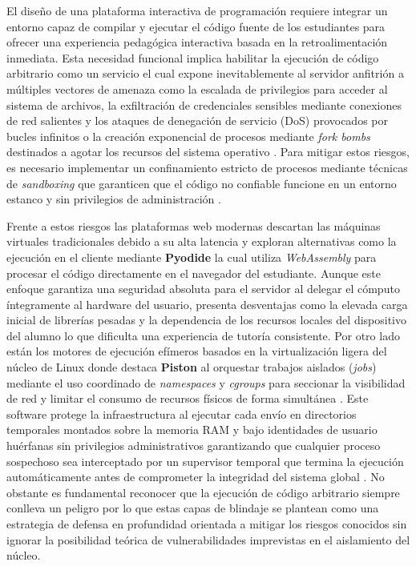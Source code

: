 El diseño de una plataforma interactiva de programación requiere integrar un entorno capaz de compilar y ejecutar el código fuente de los estudiantes para ofrecer una experiencia pedagógica interactiva basada en la retroalimentación inmediata. Esta necesidad funcional implica habilitar la ejecución de código arbitrario como un servicio el cual expone inevitablemente al servidor anfitrión a múltiples vectores de amenaza como la escalada de privilegios para acceder al sistema de archivos, la exfiltración de credenciales sensibles mediante conexiones de red salientes y los ataques de denegación de servicio (DoS) provocados por bucles infinitos o la creación exponencial de procesos mediante \textit{fork bombs} destinados a agotar los recursos del sistema operativo \cite{sun2018security}. Para mitigar estos riesgos, es necesario implementar un confinamiento estricto de procesos mediante técnicas de \textit{sandboxing} que garanticen que el código no confiable funcione en un entorno estanco y sin privilegios de administración \cite{wan2019practical}.

Frente a estos riesgos las plataformas web modernas descartan las máquinas virtuales tradicionales debido a su alta latencia y exploran alternativas como la ejecución en el cliente mediante \textbf{Pyodide} la cual utiliza \textit{WebAssembly} para procesar el código directamente en el navegador del estudiante. Aunque este enfoque garantiza una seguridad absoluta para el servidor al delegar el cómputo íntegramente al hardware del usuario, presenta desventajas como la elevada carga inicial de librerías pesadas y la dependencia de los recursos locales del dispositivo del alumno lo que dificulta una experiencia de tutoría consistente. Por otro lado están los motores de ejecución efímeros basados en la virtualización ligera del núcleo de Linux donde destaca \textbf{Piston} al orquestar trabajos aislados (\textit{jobs}) mediante el uso coordinado de \textit{namespaces} y \textit{cgroups} para seccionar la visibilidad de red y limitar el consumo de recursos físicos de forma simultánea \cite{rosen2013resource}. Este software protege la infraestructura al ejecutar cada envío en directorios temporales montados sobre la memoria RAM y bajo identidades de usuario huérfanas sin privilegios administrativos garantizando que cualquier proceso sospechoso sea interceptado por un supervisor temporal que termina la ejecución automáticamente antes de comprometer la integridad del sistema global \cite{engineerman_piston}. No obstante es fundamental reconocer que la ejecución de código arbitrario siempre conlleva un peligro por lo que estas capas de blindaje se plantean como una estrategia de defensa en profundidad orientada a mitigar los riesgos conocidos sin ignorar la posibilidad teórica de vulnerabilidades imprevistas en el aislamiento del núcleo.
